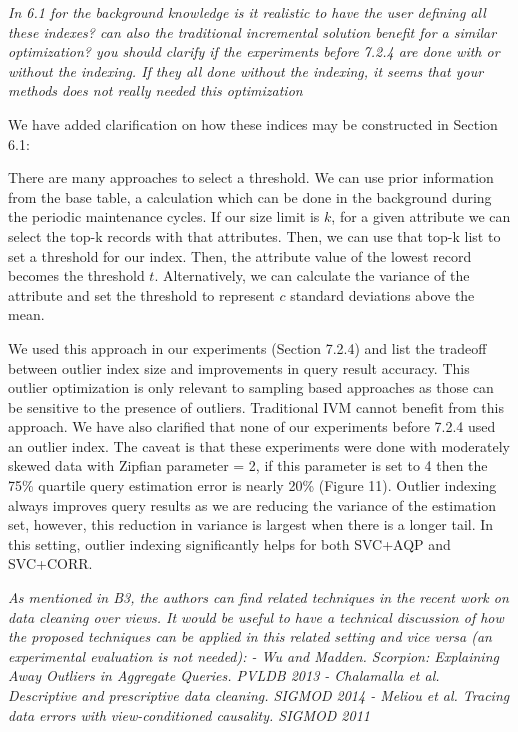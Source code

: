 \noindent\emph{In 6.1 for the background knowledge is it realistic to have the user defining all these indexes? can also the traditional incremental solution benefit for a similar optimization? you should clarify if the experiments before 7.2.4 are done with or without the indexing. If they all done without the indexing, it seems that your methods does not really needed this optimization}

We have added clarification on how these indices may be constructed in Section 6.1:
\begin{displayquote}There are many approaches to select a threshold. We can use prior information from the base table, a calculation which can be done in the background during the periodic maintenance cycles. If our size limit is $k$, for a given attribute we can select the top-k records with that attributes. Then, we can use that top-k list to set a threshold for our index.  Then, the attribute value of the lowest record becomes the threshold $t$. Alternatively, we can calculate the variance of the attribute and set the threshold to represent $c$ standard deviations above the mean.\end{displayquote}
We used this approach in our experiments (Section 7.2.4) and list the tradeoff between outlier index size and improvements in query result accuracy.
This outlier optimization is only relevant to sampling based approaches as those can be sensitive to the presence of outliers. Traditional IVM cannot benefit from this approach. 
We have also clarified that none of our experiments before 7.2.4 used an outlier index. The caveat is that these experiments were done with moderately skewed data with Zipfian parameter = 2, if this parameter is set to 4 then the 75\% quartile query estimation error is nearly 20\% (Figure 11). 
Outlier indexing always improves query results as we are reducing the variance of the estimation set, however, this reduction in variance is largest when there is a longer tail.
In this setting, outlier indexing significantly helps for both SVC+AQP and SVC+CORR. 

\vspace{1em}
\emph{As mentioned in B3, the authors can find related techniques in the recent work on data cleaning over views. It would be useful to have a technical discussion of how the proposed techniques can be applied in this related setting and vice versa (an experimental evaluation is not needed):
- Wu and Madden. Scorpion: Explaining Away Outliers in Aggregate Queries. PVLDB 2013
- Chalamalla et al. Descriptive and prescriptive data cleaning. SIGMOD 2014
- Meliou et al. Tracing data errors with view-conditioned causality. SIGMOD 2011}

